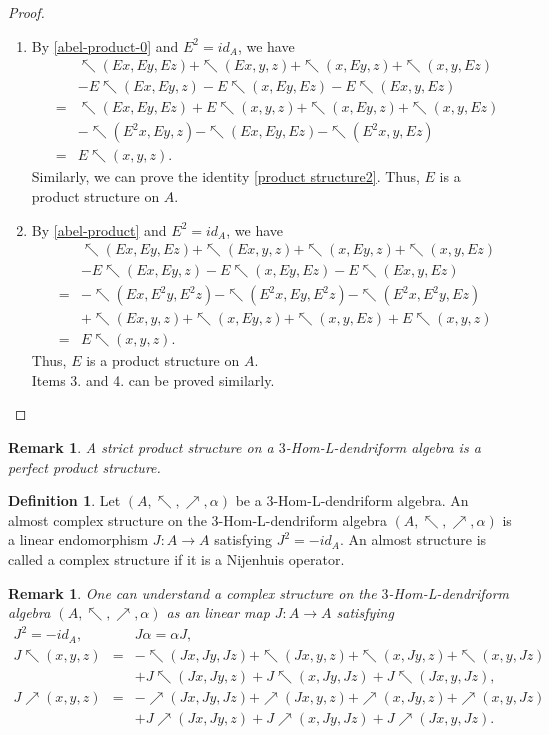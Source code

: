 \documentclass[a4paper,11pt]{article}
\def\a{\alpha}
\def\nw{\nwarrow}
\def\ne{\nearrow}
\newtheorem{rem}[thm]{Remark}
\theoremstyle{definition}
\newtheorem{defi}{Definition}[section]
\begin{document}
   \begin{proof}
     \begin{enumerate}
       \item By \eqref{abel-product-0} and $E^2=id_A$, we have
\begin{eqnarray*}
&&\nw(Ex,Ey,Ez)+\nw(Ex,y,z)+\nw(x,Ey,z)+\nw(x,y,Ez)\\
&&-E\nw(Ex,Ey,z)-E\nw(x,Ey,Ez)-E\nw(Ex,y,Ez)\\
&=&\nw(Ex,Ey,Ez)+E\nw(x,y,z)+\nw(x,Ey,z)+\nw(x,y,Ez)\\
&&-\nw(E^2x,Ey,z)-\nw(Ex,Ey,Ez)-\nw(E^2x,y,Ez)\\
&=&E\nw(x,y,z).
\end{eqnarray*}
Similarly, we can prove the identity \eqref{product structure2}.
Thus, $E$ is a product structure on $A$.
       \item By \eqref{abel-product} and $E^2=id_A$, we have
\begin{eqnarray*}
&&\nw(Ex,Ey,Ez)+\nw(Ex,y,z)+\nw(x,Ey,z)+\nw(x,y,Ez)\\
&&-E\nw(Ex,Ey,z)-E\nw(x,Ey,Ez)-E\nw(Ex,y,Ez)\\
&=&-\nw(Ex,E^2y,E^2z)-\nw(E^2x,Ey,E^2z)-\nw(E^2x,E^2y,Ez)\\
&&+\nw(Ex,y,z)+\nw(x,Ey,z)+\nw(x,y,Ez)+E\nw(x,y,z)\\
&=&E\nw(x,y,z).
\end{eqnarray*}
Thus,   $E$ is a product structure on $A$.\\
Items 3. and 4.  can be proved  similarly.
     \end{enumerate}
   \end{proof}
   \begin{rem}
     A strict product structure on a $3$-Hom-L-dendriform algebra    is a perfect product structure.
   \end{rem}


\begin{defi}\label{complex}
  Let $(A,\nw,\ne,\alpha)$ be a $3$-Hom-L-dendriform algebra. An almost complex  structure on the $3$-Hom-L-dendriform algebra  $(A,\nw,\ne,\alpha)$ is a linear endomorphism $J:A\to A$ satisfying $J^2 = -id_A$. An almost
 structure is called a complex  structure if it is a Nijenhuis operator.
\end{defi}
\begin{rem}\label{complex1}
  One can understand a complex  structure on the $3$-Hom-L-dendriform algebra  $(A,\nw,\ne,\alpha)$ as an linear map  $J:A\to A$ satisfying
  \begin{eqnarray}
  J^2=-id_A,&&J\a=\a J,\nonumber\\
J\nw(x,y,z)&=&-\nw(Jx,Jy,Jz)+\nw(Jx,y,z)+\nw(x,Jy,z)+\nw(x,y,Jz)\nonumber\\
\label{product complex structure1}&&+J\nw(Jx,Jy,z)+J\nw(x,Jy,Jz)+J\nw(Jx,y,Jz),\\
J\ne(x,y,z)&=&-\ne(Jx,Jy,Jz)+\ne(Jx,y,z)+\ne(x,Jy,z)+\ne(x,y,Jz)\nonumber\\
&&+J\ne(Jx,Jy,z)+J\ne(x,Jy,Jz)+J\ne(Jx,y,Jz)
\label{product complex structure2}.
\end{eqnarray}

\end{rem}
\end{document}
